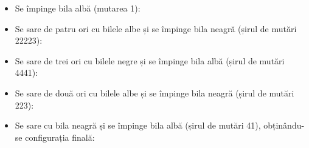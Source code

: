 \begin{itemize}

\item Se împinge bila albă (mutarea 1):


  \hfil\hdashrule{6cm}{1pt}{1pt 4pt}\hfil

\item Se sare de patru ori cu bilele albe și se împinge bila neagră (șirul
  de mutări 22223):


\item Se sare de trei ori cu bilele negre și se împinge bila albă (șirul de
  mutări 4441):


\item Se sare de două ori cu bilele albe și se împinge bila neagră (șirul de
  mutări 223):


\item Se sare cu bila neagră și se împinge bila albă (șirul de mutări 41),
  obținându-se configurația finală:


\end{itemize}


